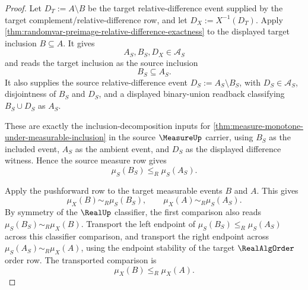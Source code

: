 \begin{proof}
Let $D_T:=A\setminus B$ be the target relative-difference event supplied by the target complement/relative-difference row, and let $D_X:=X^{-1}(D_T)$. Apply \autoref{thm:randomvar-preimage-relative-difference-exactness} to the displayed target inclusion $B\subseteq A$. It gives
$$
A_S,B_S,D_X\in\mathcal{A}_S
$$
and reads the target inclusion as the source inclusion
$$
B_S\subseteq A_S.
$$
It also supplies the source relative-difference event $D_S:=A_S\setminus B_S$, with $D_S\in\mathcal{A}_S$, disjointness of $B_S$ and $D_S$, and a displayed binary-union readback classifying $B_S\cup D_S$ as $A_S$.

These are exactly the inclusion-decomposition inputs for \autoref{thm:measure-monotone-under-measurable-inclusion} in the source $\MeasureUp$ carrier, using $B_S$ as the included event, $A_S$ as the ambient event, and $D_S$ as the displayed difference witness. Hence the source measure row gives
$$
\mu_S(B_S)\le_R\mu_S(A_S).
$$

Apply the pushforward row to the target measurable events $B$ and $A$. This gives
$$
\mu_X(B)\sim_R\mu_S(B_S),\qquad \mu_X(A)\sim_R\mu_S(A_S).
$$
By symmetry of the $\RealUp$ classifier, the first comparison also reads $\mu_S(B_S)\sim_R\mu_X(B)$. Transport the left endpoint of $\mu_S(B_S)\le_R\mu_S(A_S)$ across this classifier comparison, and transport the right endpoint across $\mu_S(A_S)\sim_R\mu_X(A)$, using the endpoint stability of the target $\RealAlgOrder$ order row. The transported comparison is
$$
\mu_X(B)\le_R\mu_X(A).
$$
\end{proof}

